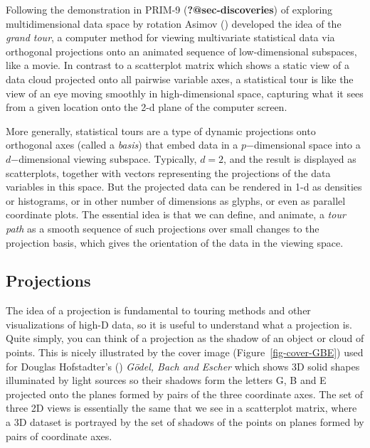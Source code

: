 \documentclass[
  letterpaper,
  10pt,
  krantz2]{krantz}
\begin{document}
Following the demonstration in PRIM-9 (\textbf{?@sec-discoveries}) of
exploring multidimensional data space by rotation Asimov
() developed the idea of the \emph{grand
tour}, a computer method for viewing multivariate statistical data via
orthogonal projections onto an animated sequence of low-dimensional
subspaces, like a movie. In contrast to a scatterplot matrix which shows
a static view of a data cloud projected onto all pairwise variable axes,
a statistical tour is like the view of an eye moving smoothly in
high-dimensional space, capturing what it sees from a given location
onto the 2-d plane of the computer screen.

More generally, statistical tours are a type of dynamic projections onto
orthogonal axes (called a \emph{basis}) that embed data in a
\(p\)−dimensional space into a \(d\)−dimensional viewing subspace.
Typically, \(d=2\), and the result is displayed as scatterplots,
together with vectors representing the projections of the data variables
in this space. But the projected data can be rendered in 1-d as
densities or histograms, or in other number of dimensions as glyphs, or
even as parallel coordinate plots. The essential idea is that we can
define, and animate, a \emph{tour path} as a smooth sequence of such
projections over small changes to the projection basis, which gives the
orientation of the data in the viewing space.

\subsection{Projections}\label{projections}

The idea of a projection is fundamental to touring methods and other
visualizations of high-D data, so it is useful to understand what a
projection is. Quite simply, you can think of a projection as the shadow
of an object or cloud of points. This is nicely illustrated by the cover
image (Figure~\ref{fig-cover-GBE}) used for Douglas Hofstadter's
() \emph{Gödel, Bach and Escher}
which shows 3D solid shapes illuminated by light sources so their
shadows form the letters G, B and E projected onto the planes formed by
pairs of the three coordinate axes. The set of three 2D views is
essentially the same that we see in a scatterplot matrix, where a 3D
dataset is portrayed by the set of shadows of the points on planes
formed by pairs of coordinate axes.
\end{document}
